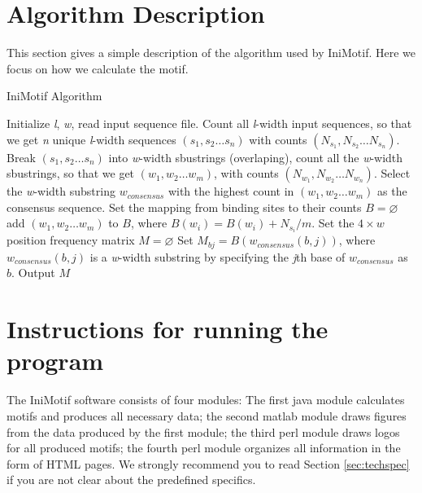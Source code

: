 \documentclass[a4paper,10pt]{article}
\begin{document}
\section{Algorithm Description}
This section gives a simple description of the algorithm used by IniMotif. Here we focus on how we calculate the motif.
\begin{algorithm}
 \caption{IniMotif Algorithm}
 \label{IniMotifAlgorithm}
 \begin{algorithmic}[1]
  \STATE Initialize \textit{l}, \textit{w}, read input sequence file.
  \STATE Count all \textit{l}-width input sequences, so that we get \textit{n} unique \textit{l}-width sequences $(s_1, s_2 \ldots s_n)$ with counts $(N_{s_1}, N_{s_2} \ldots N_{s_n})$.
  \STATE Break $(s_1, s_2 \ldots s_n)$ into \textit{w}-width sbustrings (overlaping), count all the \textit{w}-width sbustrings, so that we get $(w_1, w_2 \ldots w_m)$, with counts $(N_{w_1}, N_{w_2} \ldots N_{w_n})$. 
  \STATE Select the \textit{w}-width substring $w_{consensus}$ with the highest count in $(w_1, w_2 \ldots w_m)$ as the consensus sequence.
  \STATE Set the mapping from binding sites to their counts $B = \varnothing$
    \STATE add $(w_1, w_2 \ldots w_m)$ to $B$, where $B(w_i) = B(w_i) + N_{s_i}/m$.
   \ENDIF
  \ENDFOR
  \STATE Set the $4 \times w$ position frequency matrix $M = \varnothing$
    \STATE Set $M_{bj} = B(w_{consensus}(b,j))$, where $w_{consensus}(b,j)$ is a \textit{w}-width substring by specifying the \textit{j}th base of $w_{consensus}$ as $b$.
   \ENDFOR
  \ENDFOR
  \STATE Output $M$
 \end{algorithmic}
\end{algorithm}



\section{Instructions for running the program}
The IniMotif software consists of four modules: The first java module calculates motifs and produces all necessary data;
the second matlab module draws figures from the data produced by the first module;
the third perl module draws logos for all produced motifs;
the fourth perl module organizes all information in the form of HTML pages.
We strongly recommend you to read Section \ref{sec:techspec} if you are not clear about the predefined specifics.
\end{document}
